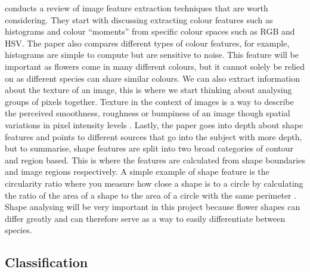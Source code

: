 \documentclass[12pt,a4paper]{report}
\begin{document}
\citet{tian2013} conducts a review of image feature extraction techniques that are worth considering. They 
start with discussing extracting colour features such as histograms and colour “moments” from specific colour spaces 
such as RGB and HSV. The paper also compares different types of colour features, for example, histograms are simple to 
compute but are sensitive to noise.  This feature will be important as flowers come in many different colours, but it 
cannot solely be relied on as different species can share similar colours. We can also extract information about 
the texture of an image, this is where we start thinking about analysing groups of pixels together. Texture in the 
context of images is a way to describe the perceived smoothness, roughness or bumpiness of an image though spatial 
variations in pixel intensity levels \citep{mathworks}. Lastly, the paper goes into depth about shape features and 
points to different sources that go into the subject with more depth, but to summarise, shape features are 
split into two broad categories of contour and region based. This is where the features are calculated from shape 
boundaries and image regions respectively. A simple example of shape feature is the circularity ratio where you measure 
how close a shape is to a circle by calculating the ratio of the area of a shape to the area of a circle with the same 
perimeter \citep{mingqiang2008survey}. Shape analysing will be very important in this project because flower shapes can
differ greatly and can therefore serve as a way to easily differentiate between species.

\subsection{Classification}
\end{document}
